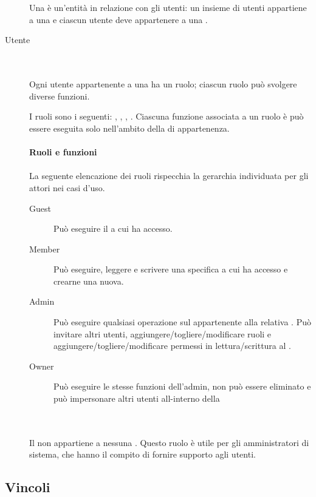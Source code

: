 \begin{description}
	\item[] \hfill \\\\
	Una  \`e un'entit\`a in relazione con gli utenti: un insieme di utenti appartiene a una  e ciascun utente deve appartenere a una .
	\item[Utente] \hfill \\\\
	Ogni utente appartenente a una  ha un ruolo; ciascun ruolo pu\`o svolgere diverse funzioni.	
	
	I ruoli sono i seguenti: , , , .	
	Ciascuna funzione associata a un ruolo \`e pu\`o essere eseguita solo nell'ambito della  di appartenenza. \\\\
	\textbf{Ruoli e funzioni} \hfill \\\\
		La seguente elencazione dei ruoli rispecchia la gerarchia individuata per gli attori nei casi d'uso.
		\begin{description}
			\item[Guest] Pu\`o eseguire il  a cui ha accesso.
			\item[Member] Pu\`o eseguire, leggere e scrivere una specifica  a cui ha accesso e crearne una nuova.
			\item[Admin] Pu\`o eseguire qualsiasi operazione sul  appartenente alla relativa . Pu\`o invitare altri utenti, aggiungere/togliere/modificare ruoli e aggiungere/togliere/modificare permessi in lettura/scrittura al .
			\item[Owner] Pu\`o eseguire le stesse funzioni dell'admin, non pu\`o essere eliminato e pu\`o impersonare altri utenti all-interno della 
		\end{description}
	\item[] \hfill \\\\
	Il  non appartiene a nessuna . Questo ruolo \`e utile per gli amministratori di sistema, che hanno il compito di fornire supporto agli utenti.
\end{description}
\subsection{Vincoli}